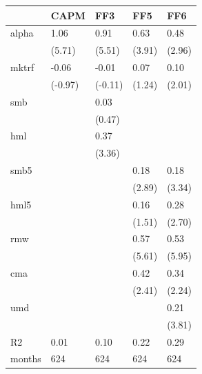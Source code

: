 \begin{tabular}{lllll}
\toprule
 & CAPM & FF3 & FF5 & FF6 \\
\midrule
alpha & 1.06 & 0.91 & 0.63 & 0.48 \\
 & (5.71) & (5.51) & (3.91) & (2.96) \\
mktrf & -0.06 & -0.01 & 0.07 & 0.10 \\
 & (-0.97) & (-0.11) & (1.24) & (2.01) \\
smb &  & 0.03 &  &  \\
 &  & (0.47) &  &  \\
hml &  & 0.37 &  &  \\
 &  & (3.36) &  &  \\
smb5 &  &  & 0.18 & 0.18 \\
 &  &  & (2.89) & (3.34) \\
hml5 &  &  & 0.16 & 0.28 \\
 &  &  & (1.51) & (2.70) \\
rmw &  &  & 0.57 & 0.53 \\
 &  &  & (5.61) & (5.95) \\
cma &  &  & 0.42 & 0.34 \\
 &  &  & (2.41) & (2.24) \\
umd &  &  &  & 0.21 \\
 &  &  &  & (3.81) \\
R2 & 0.01 & 0.10 & 0.22 & 0.29 \\
months & 624 & 624 & 624 & 624 \\
\bottomrule
\end{tabular}
